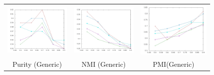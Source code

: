 \documentclass[10pt,a5paper,twoside]{article}
\begin{document}
\begin{figure}[t!]
\begin{center}
\resizebox{14cm}{!} 
{
	\begin{tabular}{ccc}
	
		\includegraphics[width=140pt]{Figs/1-1.jpg} & 
		\includegraphics[width=140pt]{Figs/1-2.jpg} & 
		\includegraphics[width=140pt]{Figs/1-3.jpg} \\  
	
		{\footnotesize Purity (Generic)} & {\footnotesize NMI (Generic)} & 
		{\footnotesize PMI(Generic)}\\
	

\end{tabular}}
\end{center}
\end{figure}
\end{document}
